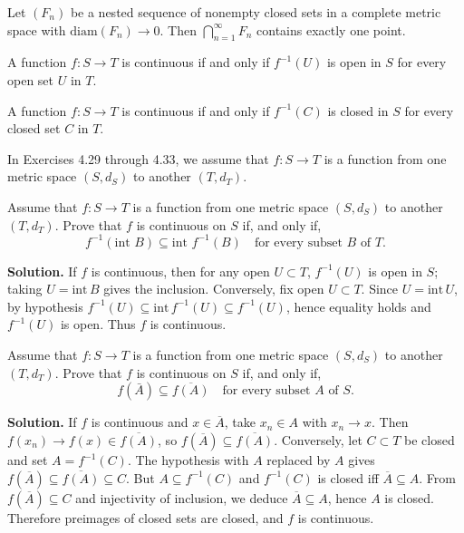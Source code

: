 \begin{theorem}
Let $(F_n)$ be a nested sequence of nonempty closed sets in a complete metric space with $\text{diam}(F_n) \to 0$. Then $\bigcap_{n=1}^{\infty} F_n$ contains exactly one point.
\end{theorem}

\begin{theorem}
A function $f: S \to T$ is continuous if and only if $f^{-1}(U)$ is open in $S$ for every open set $U$ in $T$.
\end{theorem}

\begin{theorem}
A function $f: S \to T$ is continuous if and only if $f^{-1}(C)$ is closed in $S$ for every closed set $C$ in $T$.
\end{theorem}

In Exercises 4.29 through 4.33, we assume that $f:S\to T$ is a function from one metric space $(S,d_S)$ to another $(T,d_T)$.

\begin{problembox}
Assume that $f : S \rightarrow T$ is a function from one metric space $(S, d_S)$ to another $(T, d_T)$. Prove that $f$ is continuous on $S$ if, and only if,
\[ f^{-1}(\text{int } B) \subseteq \text{int } f^{-1}(B) \quad \text{for every subset } B \text{ of } T. \]
\end{problembox}

\noindent\textbf{Solution.}
If $f$ is continuous, then for any open $U\subset T$, $f^{-1}(U)$ is open in $S$; taking $U=\mathrm{int}\,B$ gives the inclusion. Conversely, fix open $U\subset T$. Since $U=\mathrm{int}\,U$, by hypothesis $f^{-1}(U)\subseteq\mathrm{int}\,f^{-1}(U)\subseteq f^{-1}(U)$, hence equality holds and $f^{-1}(U)$ is open. Thus $f$ is continuous.
\medskip

\begin{problembox}
Assume that $f : S \rightarrow T$ is a function from one metric space $(S, d_S)$ to another $(T, d_T)$. Prove that $f$ is continuous on $S$ if, and only if,
\[ f(\bar{A}) \subseteq \overline{f(A)} \quad \text{for every subset } A \text{ of } S. \]
\end{problembox}

\noindent\textbf{Solution.}
If $f$ is continuous and $x\in\overline{A}$, take $x_n\in A$ with $x_n\to x$. Then $f(x_n)\to f(x)\in\overline{f(A)}$, so $f(\overline{A})\subseteq\overline{f(A)}$. Conversely, let $C\subset T$ be closed and set $A=f^{-1}(C)$. The hypothesis with $A$ replaced by $A$ gives $f(\overline{A})\subseteq\overline{f(A)}\subseteq C$. But $A\subseteq f^{-1}(C)$ and $f^{-1}(C)$ is closed iff $\overline{A}\subseteq A$. From $f(\overline{A})\subseteq C$ and injectivity of inclusion, we deduce $\overline{A}\subseteq A$, hence $A$ is closed. Therefore preimages of closed sets are closed, and $f$ is continuous.
\medskip

